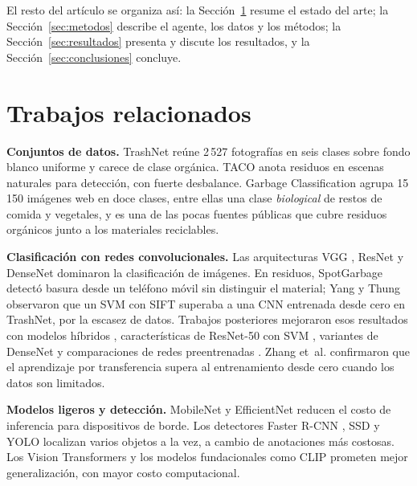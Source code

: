 \documentclass[conference,a4paper]{IEEEtran}
\begin{document}
El resto del artículo se organiza así: la Sección~\ref{sec:relacionados} resume el estado del arte; la Sección~\ref{sec:metodos} describe el agente, los datos y los métodos; la Sección~\ref{sec:resultados} presenta y discute los resultados, y la Sección~\ref{sec:conclusiones} concluye.

\section{Trabajos relacionados}\label{sec:relacionados}
\textbf{Conjuntos de datos.} TrashNet \cite{trashnet} reúne 2\,527 fotografías en seis clases sobre fondo blanco uniforme y carece de clase orgánica. TACO \cite{taco} anota residuos en escenas naturales para detección, con fuerte desbalance. Garbage Classification \cite{gc12} agrupa 15\,150 imágenes web en doce clases, entre ellas una clase \emph{biological} de restos de comida y vegetales, y es una de las pocas fuentes públicas que cubre residuos orgánicos junto a los materiales reciclables.

\textbf{Clasificación con redes convolucionales.} Las arquitecturas VGG \cite{vgg}, ResNet \cite{resnet} y DenseNet \cite{densenet} dominaron la clasificación de imágenes. En residuos, SpotGarbage \cite{spotgarbage} detectó basura desde un teléfono móvil sin distinguir el material; Yang y Thung \cite{trashnet} observaron que un SVM con SIFT superaba a una CNN entrenada desde cero en TrashNet, por la escasez de datos. Trabajos posteriores mejoraron esos resultados con modelos híbridos \cite{chu2018}, características de ResNet-50 con SVM \cite{adedeji2019}, variantes de DenseNet \cite{recyclenet} y comparaciones de redes preentrenadas \cite{ruiz2019}. Zhang et~al. \cite{zhang2021} confirmaron que el aprendizaje por transferencia \cite{pan2010} supera al entrenamiento desde cero cuando los datos son limitados.

\textbf{Modelos ligeros y detección.} MobileNet \cite{mobilenet,mobilenetv2,mobilenetv3} y EfficientNet \cite{efficientnet} reducen el costo de inferencia para dispositivos de borde. Los detectores Faster R-CNN \cite{fasterrcnn}, SSD \cite{ssd} y YOLO \cite{yolo,yolov7} localizan varios objetos a la vez, a cambio de anotaciones más costosas. Los Vision Transformers \cite{vit,swin} y los modelos fundacionales como CLIP \cite{clip} prometen mejor generalización, con mayor costo computacional.
\end{document}
